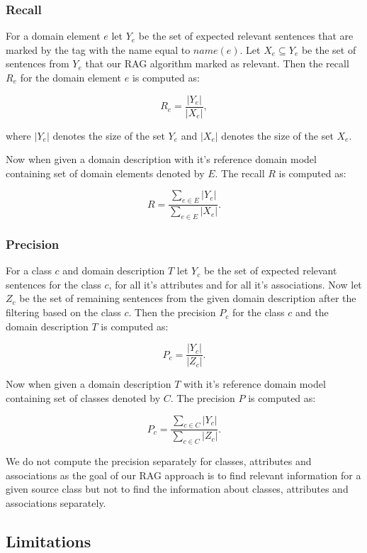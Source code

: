 \subsubsection{Recall}

For a domain element $e$ let $Y_e$ be the set of expected relevant sentences that are marked by the tag with the name equal to $name(e)$. Let $X_e \subseteq Y_e$ be the set of sentences from $Y_e$ that our RAG algorithm marked as relevant. Then the recall $R_e$ for the domain element $e$ is computed as:

\[ R_e = \dfrac{|Y_e|}{|X_e|}, \]

\noindent{}where $|Y_e|$ denotes the size of the set $Y_e$ and $|X_e|$ denotes the size of the set $X_e$.

Now when given a domain description with it's reference domain model containing set of domain elements denoted by $E$. The recall $R$ is computed as:

\[ R = \dfrac{\sum_{e \in E}|Y_e|}{\sum_{e \in E}|X_e|}. \]


\subsubsection{Precision}

For a class $c$ and domain description $T$ let $Y_{c}$ be the set of expected relevant sentences for the class $c$, for all it's attributes and for all it's associations. Now let $Z_{c}$ be the set of remaining sentences from the given domain description after the filtering based on the class $c$. Then the precision $P_{c}$ for the class $c$ and the domain description $T$ is computed as:

\[ P_c = \dfrac{|Y_{c}|}{|Z_c|}. \]

Now when given a domain description $T$ with it's reference domain model containing set of classes denoted by $C$. The precision $P$ is computed as:

\[ P_{c} = \dfrac{\sum_{c \in C}|Y_c|}{\sum_{c \in C}|Z_c|}. \]

We do not compute the precision separately for classes, attributes and associations as the goal of our RAG approach is to find relevant information for a given source class but not to find the information about classes, attributes and associations separately.


\subsection{Limitations}

